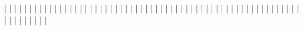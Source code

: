   |                   |                   |
  |                   |                   |
  |                   |                   |
  |                   |                   |
  |                   |                   |
  |                   |                   |
  |                   |                   |
  |                   |                   |
  |                   |                   |
  |                   |                   |
  |                   |                   |
  |                   |                   |
  |                   |                   |
  |                   |                   |
  |                   |                   |
  |                   |                   |
  |                   |                   |
  |                   |                   |
  |                   |                   |
  |                   |                   |
  |                   |                   |
  |                   |                   |
  |                   |